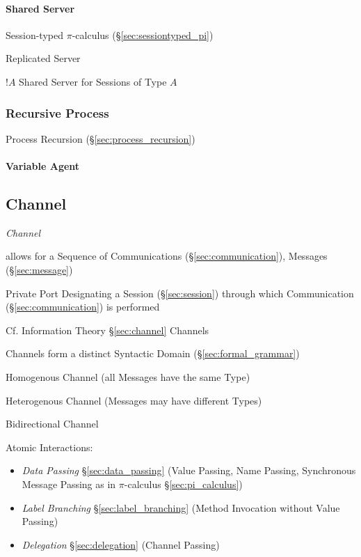 \paragraph{Shared Server}\label{sec:shared_server}\hfill

Session-typed $\pi$-calculus (\S\ref{sec:sessiontyped_pi})

Replicated Server

$!A$ Shared Server for Sessions of Type $A$



\subsubsection{Recursive Process}\label{sec:recursive_process}

Process Recursion (\S\ref{sec:process_recursion})



\paragraph{Variable Agent}\label{sec:variable_agent}\hfill



\subsection{Channel}\label{sec:process_channel}

\emph{Channel}

allows for a Sequence of Communications (\S\ref{sec:communication}),
Messages (\S\ref{sec:message})

Private Port Designating a Session (\S\ref{sec:session}) through which
Communication (\S\ref{sec:communication}) is performed
\cite{honda-vasconcelos-kubo98}

\fist Cf. Information Theory \S\ref{sec:channel} Channels

Channels form a distinct Syntactic Domain (\S\ref{sec:formal_grammar})
\cite{honda-vasconcelos-kubo98}

Homogenous Channel (all Messages have the same Type)

Heterogenous Channel (Messages may have different Types)

Bidirectional Channel

Atomic Interactions:
\begin{itemize}
  \item \emph{Data Passing} \S\ref{sec:data_passing} (Value Passing,
    Name Passing, Synchronous Message Passing as in $\pi$-calculus
    \S\ref{sec:pi_calculus})
  \item \emph{Label Branching} \S\ref{sec:label_branching} (Method
    Invocation without Value Passing)
  \item \emph{Delegation} \S\ref{sec:delegation} (Channel Passing)
\end{itemize}

